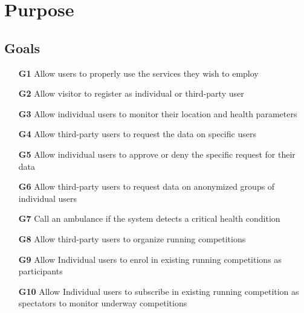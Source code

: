 \section{Purpose}
\subsection{Goals}
\begin{itemize}
\item
[\textbf{G1}] Allow users to properly use the services they wish to employ
\item
[\textbf{G2}] Allow visitor to register as individual or third-party user
\item
[\textbf{G3}] Allow individual users to monitor their location and health parameters
\item
[\textbf{G4}] Allow third-party users to request the data on specific users
\item
[\textbf{G5}] Allow individual users to approve or deny the specific request for their data
\item
[\textbf{G6}] Allow third-party users to request data on anonymized groups of individual users
\item
[\textbf{G7}] Call an ambulance if the system detects a critical health condition
\item
[\textbf{G8}] Allow third-party users to organize running competitions
\item
[\textbf{G9}] Allow Individual users to enrol in existing running competitions as participants 
\item
[\textbf{G10}] Allow Individual users to subscribe in existing running competition as spectators to monitor underway competitions
\end{itemize}



